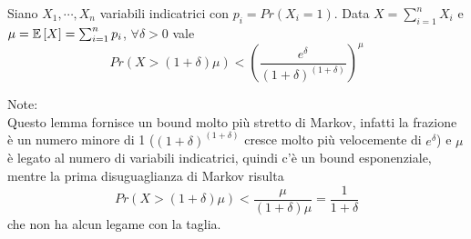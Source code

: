\begin{lemma}
    [Chernoff]
    \label{def:lemma_chernoff}
    Siano $
    X_1, \cdots, X_n
    $ variabili indicatrici con $
    p_i = Pr \left( X_i = 1 \right)
    $. Data $
    X = \sum_{i=1}^{n} X_i
    $ e $
    \mu
    =
    \mathbb{E}\left[X\right]
    =
    \sum_{i=1}^{n} p_i
    $, $
    \forall \delta > 0
    $ vale
    \begin{equation*}
        Pr \left( 
            X > \left( 1+ \delta \right) \mu
        \right)
        <
        \left( 
            \frac{
                e^{\delta}
            }{
                \left( 
                    1 + \delta
                \right)^{
                    \left( 
                        1 + \delta
                    \right)
                }
            }
        \right)^{\mu}
    \end{equation*}
\end{lemma}
Note:
\\
Questo lemma fornisce un bound molto più stretto di Markov, infatti 
la frazione è un numero minore di 1 ($
    \left( 
        1 + \delta
    \right)^{
        \left( 
            1 + \delta
        \right)
    }
$ cresce molto più velocemente di $
e^\delta
$) e 
$\mu$ è legato al numero di variabili indicatrici,
quindi c'è un bound esponenziale,
mentre la prima disuguaglianza di Markov risulta
\begin{equation*}
    Pr \left( 
        X > \left( 1+ \delta \right) \mu
    \right)
    < 
    \frac{\mu}{
        \left( 
            1 + \delta
        \right)
        \mu
    }
    =
    \frac{1}{
        1 + \delta
    }
\end{equation*}
che non ha alcun legame con la taglia.


